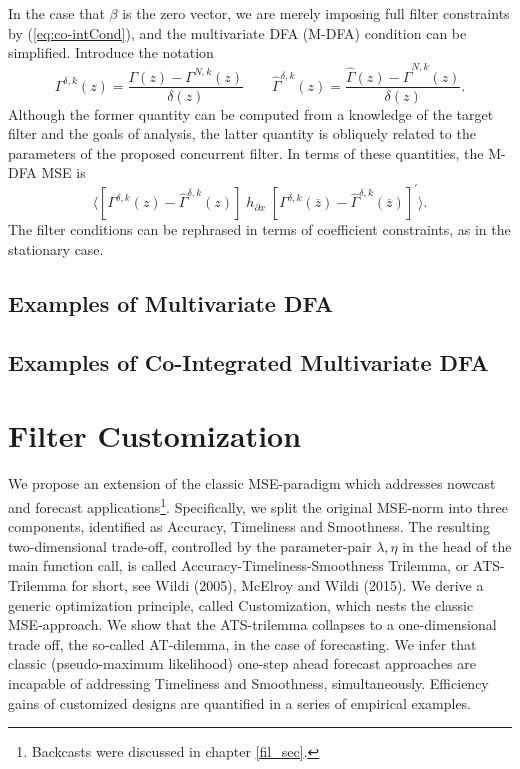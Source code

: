 \documentclass[a4paper]{book}
\begin{document}
 In the case that $\beta$ is the zero vector, we are merely imposing full filter constraints by (\ref{eq:co-intCond}), and the multivariate DFA (M-DFA) condition
  can be simplified.  Introduce the notation
\[
    \Gamma^{\delta,k} (z) =  \frac{ \Gamma (z) - \Gamma^{N,k} (z) }{ \delta (z) } \qquad
  \widehat{\Gamma}^{\delta, k} (z) =  \frac{ \widehat{\Gamma} (z) - \widehat{\Gamma}^{N,k} (z) }{ \delta (z) }.
\]
  Although the former quantity can be computed from a knowledge of the target filter and the goals of analysis, the latter quantity is obliquely related to the parameters of the proposed concurrent filter.  In terms of these quantities, the M-DFA MSE is
\[
 \langle   \left[   \Gamma^{\delta, k} (z) -  \widehat{\Gamma}^{\delta, k} (z)  \right]   \; h_{\partial x} \;
  { \left[  \Gamma^{\delta, k} (\overline{z}) -  \widehat{\Gamma}^{\delta, k} (\overline{z})    \right] }^{\prime} \rangle.
\]
 The filter conditions can be rephrased in terms of coefficient constraints, as in the stationary case.  


\section{Examples of Multivariate DFA}


\section{Examples of Co-Integrated Multivariate DFA}





 



\chapter{Filter Customization}
\label{chap:ats}

We propose an extension of the classic MSE-paradigm which addresses
 nowcast and forecast applications\footnote{Backcasts were discussed 
in chapter \ref{fil_sec}.}. Specifically, we split the original MSE-norm 
into three components, identified as Accuracy, Timeliness and Smoothness. 
The resulting two-dimensional trade-off, controlled by the parameter-pair 
$\lambda,\eta$ in the head of the main function call, is called 
Accuracy-Timeliness-Smoothness Trilemma, or ATS-Trilemma for short,
 see Wildi (2005), McElroy and Wildi (2015). We derive  a generic 
optimization principle, called Customization, which nests the classic
 MSE-approach.  We show that the ATS-trilemma collapses to a one-dimensional 
trade off, the so-called AT-dilemma, in the case of forecasting. We infer 
 that classic (pseudo-maximum likelihood)  one-step ahead forecast
 approaches are incapable of addressing Timeliness and Smoothness, 
simultaneously. Efficiency gains of customized designs are quantified 
in a series of empirical examples. \\
\end{document}
